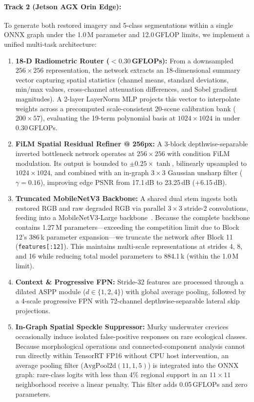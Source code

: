 \documentclass{article}
\begin{document}
\paragraph{Track 2 (Jetson AGX Orin Edge):} To generate both restored imagery and 5-class segmentations within a single ONNX graph under the 1.0\,M parameter and 12.0\,GFLOP limits, we implement a unified multi-task architecture:
\begin{enumerate}[leftmargin=*]
    \item \textbf{18-D Radiometric Router ($<0.30$\,GFLOPs):} From a downsampled $256\times256$ representation, the network extracts an 18-dimensional summary vector capturing spatial statistics (channel means, standard deviations, min/max values, cross-channel attenuation differences, and Sobel gradient magnitudes). A 2-layer LayerNorm MLP projects this vector to interpolate weights across a precomputed scale-consistent 20-scene calibration bank ($200 \times 57$), evaluating the 19-term polynomial basis at $1024\times1024$ in under 0.30\,GFLOPs.
    \item \textbf{FiLM Spatial Residual Refiner @ 256px:} A 3-block depthwise-separable inverted bottleneck network operates at $256\times256$ with condition FiLM modulation. Its output is bounded to $\pm 0.25 \times \tanh$, bilinearly upsampled to $1024\times1024$, and combined with an in-graph $3\times3$ Gaussian unsharp filter ($\gamma = 0.16$), improving edge PSNR from 17.1\,dB to 23.25\,dB (+6.15\,dB).
    \item \textbf{Truncated MobileNetV3 Backbone:} A shared dual stem ingests both restored RGB and raw degraded RGB via parallel $3\times3$ stride-2 convolutions, feeding into a MobileNetV3-Large backbone~\cite{howard2019mobilenetv3}. Because the complete backbone contains 1.27\,M parameters—exceeding the competition limit due to Block 12's 386\,k parameter expansion—we truncate the network after Block 11 (\texttt{features[:12]}). This maintains multi-scale representations at strides 4, 8, and 16 while reducing total model parameters to 884.1\,k (within the 1.0\,M limit).
    \item \textbf{Context \& Progressive FPN:} Stride-32 features are processed through a dilated ASPP module ($d \in \{1, 2, 4\}$) with global average pooling, followed by a 4-scale progressive FPN with 72-channel depthwise-separable lateral skip projections.
    \item \textbf{In-Graph Spatial Speckle Suppressor:} Murky underwater crevices occasionally induce isolated false-positive responses on rare ecological classes. Because morphological operations and connected-component analysis cannot run directly within TensorRT FP16 without CPU host intervention, an average pooling filter ($\text{AvgPool2d}(11, 1, 5)$) is integrated into the ONNX graph: rare-class logits with less than 4\% regional support in an $11\times11$ neighborhood receive a linear penalty. This filter adds 0.05\,GFLOPs and zero parameters.
\end{enumerate}
\end{document}
